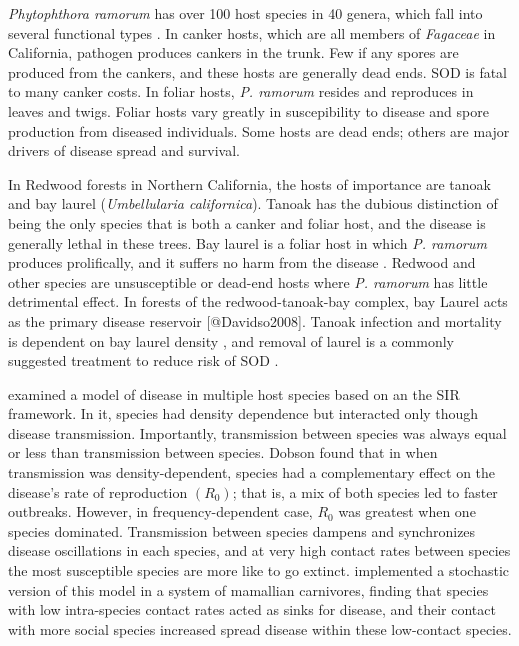 \documentclass[english,nohyper,nofonts,nobib,nols,twoside]{tufte-handout}
\renewcommand\citep\cite
\let\oldcitet\citet
\renewcommand{\citet}[1]{\oldcitet{#1}\cite{#1}}
\begin{document}
\emph{Phytophthora ramorum} has over 100 host species in 40 genera,
which fall into several functional types \citep{Swiecki2013}. In canker
hosts, which are all members of \emph{Fagaceae} in California, pathogen
produces cankers in the trunk. Few if any spores are produced from the
cankers, and these hosts are generally dead ends. SOD is fatal to many
canker costs. In foliar hosts, \emph{P. ramorum} resides and reproduces
in leaves and twigs. Foliar hosts vary greatly in suscepibility to
disease and spore production from diseased individuals. Some hosts are
dead ends; others are major drivers of disease spread and survival.

In Redwood forests in Northern California, the hosts of importance are
tanoak and bay laurel (\emph{Umbellularia californica}). Tanoak has the
dubious distinction of being the only species that is both a canker and
foliar host, and the disease is generally lethal in these trees. Bay
laurel is a foliar host in which \emph{P. ramorum} produces
prolifically, and it suffers no harm from the disease \citep{DiLeo2009}.
Redwood and other species are unsusceptible or dead-end hosts where
\emph{P. ramorum} has little detrimental effect. In forests of the
redwood-tanoak-bay complex, bay Laurel acts as the primary disease
reservoir {[}@Davidso2008{]}. Tanoak infection and mortality is
dependent on bay laurel density \citep{Cobb2012}, and removal of laurel
is a commonly suggested treatment to reduce risk of SOD
\citep[@Filipe2013;][]{Swiecki2013}.

\citet{Dobson2004} examined a model of disease in multiple host species
based on an the SIR \citep{Kermack1927} framework. In it, species had
density dependence but interacted only though disease transmission.
Importantly, transmission between species was always equal or less than
transmission between species. Dobson found that in when transmission was
density-dependent, species had a complementary effect on the disease's
rate of reproduction $(R_0)$; that is, a mix of both species led to
faster outbreaks. However, in frequency-dependent case, $R_0$ was
greatest when one species dominated. Transmission between species
dampens and synchronizes disease oscillations in each species, and at
very high contact rates between species the most susceptible species are
more like to go extinct. \citet{Craft2008} implemented a stochastic
version of this model in a system of mamallian carnivores, finding that
species with low intra-species contact rates acted as sinks for disease,
and their contact with more social species increased spread disease
within these low-contact species.
\end{document}
